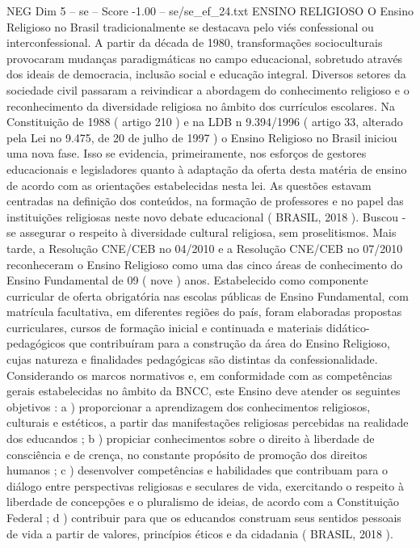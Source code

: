 \begin{textsample}{NEG Dim 5 – se – Score -1.00 – se/se\_ef\_24.txt}  \label{ex:f5_neg_155}
ENSINO RELIGIOSO O Ensino Religioso no Brasil tradicionalmente se destacava pelo viés confessional ou interconfessional.
A partir da década de 1980, transformações socioculturais provocaram mudanças paradigmáticas no campo educacional, sobretudo através dos ideais de democracia, inclusão social e educação integral.
Diversos setores da sociedade civil passaram a reivindicar a abordagem do conhecimento religioso e o reconhecimento da diversidade religiosa no âmbito dos currículos escolares.
Na Constituição de 1988 ( artigo 210 ) e na LDB n 9.394/1996 ( artigo 33, alterado pela Lei no 9.475, de 20 de julho de 1997 ) o Ensino Religioso no Brasil iniciou uma nova fase.
Isso se evidencia, primeiramente, nos esforços de gestores educacionais e legisladores quanto à adaptação da oferta desta matéria de ensino de acordo com as orientações estabelecidas nesta lei.
As questões estavam centradas na definição dos conteúdos, na formação de professores e no papel das instituições religiosas neste novo debate educacional ( BRASIL, 2018 ).
Buscou -se assegurar o respeito à diversidade cultural religiosa, sem proselitismos.
Mais tarde, a Resolução CNE/CEB no 04/2010 e a Resolução CNE/CEB no 07/2010 reconheceram o Ensino Religioso como uma das cinco áreas de conhecimento do Ensino Fundamental de 09 ( nove ) anos.
Estabelecido como componente curricular de oferta obrigatória nas escolas públicas de Ensino Fundamental, com matrícula facultativa, em diferentes regiões do país, foram elaboradas propostas curriculares, cursos de formação inicial e continuada e materiais didático-pedagógicos que contribuíram para a construção da área do Ensino Religioso, cujas natureza e finalidades pedagógicas são distintas da confessionalidade.
Considerando os marcos normativos e, em conformidade com as competências gerais estabelecidas no âmbito da BNCC, este Ensino deve atender os seguintes objetivos : a ) proporcionar a aprendizagem dos conhecimentos religiosos, culturais e estéticos, a partir das manifestações religiosas percebidas na realidade dos educandos ; b ) propiciar conhecimentos sobre o direito à liberdade de consciência e de crença, no constante propósito de promoção dos direitos humanos ; c ) desenvolver competências e habilidades que contribuam para o diálogo entre perspectivas religiosas e seculares de vida, exercitando o respeito à liberdade de concepções e o pluralismo de ideias, de acordo com a Constituição Federal ; d ) contribuir para que os educandos construam seus sentidos pessoais de vida a partir de valores, princípios éticos e da cidadania ( BRASIL, 2018 ).

\end{textsample}
